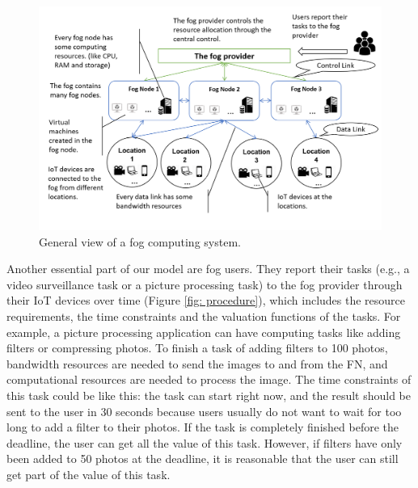 \documentclass[11pt]{phdthesis}
\begin{document}
\begin{figure}
    \centering
    \includegraphics[width=1.0\textwidth]{./Figures/system_structure.png}
    \caption{\label{fig:system_structure} General view of a fog computing system.}
\end{figure}

Another essential part of our model are fog users. They report their tasks (e.g., a video surveillance task or a picture processing task) to the fog provider through their IoT devices over time (Figure \ref{fig: procedure}), which includes the resource requirements, the time constraints and the valuation functions of the tasks. For example, a picture processing application can have computing tasks like adding filters or compressing photos. To finish a task of adding filters to 100 photos, bandwidth resources are needed to send the images to and from the FN, and computational resources are needed to process the image. The time constraints of this task could be like this: the task can start right now, and the result should be sent to the user in 30 seconds because users usually do not want to wait for too long to add a filter to their photos. If the task is completely finished before the deadline, the user can get all the value of this task. However, if filters have only been added to 50 photos at the deadline, it is reasonable that the user can still get part of the value of this task. 
\end{document}
